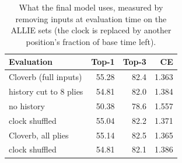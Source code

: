 \begin{table}[t]\centering\small
\caption{What the final model uses, measured by removing inputs at evaluation time on the ALLIE sets (the clock is replaced by another position's fraction of base time left).}\label{tab:ablation}
\begin{tabular}{lrrr}\toprule
Evaluation & Top-1 & Top-3 & CE\\\midrule
Cloverb (full inputs) & 55.28 & 82.4 & 1.363 \\
\quad history cut to 8 plies & 54.81 & 82.0 & 1.384 \\
\quad no history & 50.38 & 78.6 & 1.557 \\
\quad clock shuffled & 55.04 & 82.2 & 1.371 \\
Cloverb, all plies & 55.14 & 82.5 & 1.365 \\
\quad clock shuffled & 54.81 & 82.1 & 1.386 \\
\bottomrule\end{tabular}\end{table}
